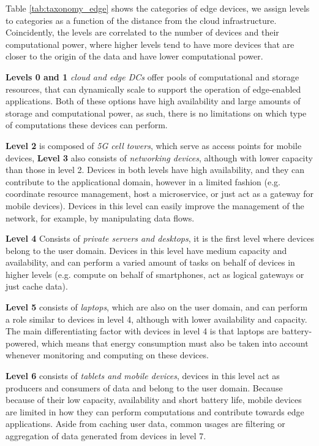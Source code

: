 Table \ref{tab:taxonomy_edge} shows the categories of edge devices, we assign levels to categories as a function of the distance from the cloud infrastructure. Coincidently, the levels are correlated to the number of devices and their computational power, where higher levels tend to have more devices that are closer to the origin of the data and have lower computational power.

\textbf{Levels 0 and 1} \textit{cloud and edge DCs} offer pools of computational and storage resources, that can dynamically scale to support the operation of edge-enabled applications. Both of these options have high availability and large amounts of storage and computational power, as such, there is no limitations on which type of computations these devices can perform.

\textbf{Level 2} is composed of \textit{5G cell towers}, which serve as access points for mobile devices, \textbf{Level 3} also consists of \textit{networking devices}, although with lower capacity than those in level 2. Devices in both levels have high availability, and they can contribute to the applicational domain, however in a limited fashion (e.g. coordinate resource management, host a microservice, or just act as a gateway for mobile devices). Devices in this level can easily improve the management of the network, for example, by manipulating data flows.

\textbf{Level 4} Consists of \textit{private servers and desktops}, it is the first level where devices belong to the user domain. Devices in this level have medium capacity and availability, and can perform a varied amount of tasks on behalf of devices in higher levels (e.g. compute on behalf of smartphones, act as logical gateways or just cache data). 

\textbf{Level 5} consists of \textit{laptops}, which are also on the user domain, and can perform a role similar to devices in level 4, although with lower availability and capacity. The main differentiating factor with devices in level 4 is that laptops are battery-powered, which means that energy consumption must also be taken into account whenever monitoring and computing on these devices. 

\textbf{Level 6} consists of \textit{tablets and mobile devices}, devices in this level act as producers and consumers of data and belong to the user domain. Because because of their low capacity, availability and short battery life, mobile devices are limited in how they can perform computations and contribute towards edge applications. Aside from caching user data, common usages are filtering or aggregation of data generated from devices in level 7. 

